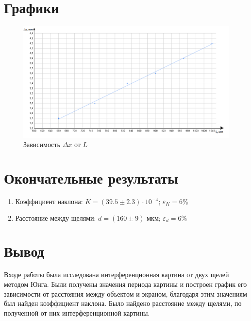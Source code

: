 \documentclass{article}
\begin{document}
\section{Графики}
\begin{figure}[h!]
    \begin{center}
    \includegraphics[scale=0.7]{chart.png}
    \caption{Зависимость $\Delta x$ от $L$}
    \label{fig:graphUfromI}    
    \end{center}
\end{figure}
\newpage
\section{Окончательные результаты}
\begin{enumerate}
    \item Коэффициент наклона: $K = (39.5 \pm 2.3 )\cdot 10^{-4}$; $\varepsilon_{K} = 6\%$  
    \item Расстояние между щелями: $d = (160 \pm 9 )$ мкм; $\varepsilon_{d} = 6\%$  
\end{enumerate}
\newpage
\section{Вывод}
Входе работы была исследована интерференционная картина от двух щелей методом Юнга. Были получены значения периода картины и построен график его зависимости от расстояния между объектом и экраном, благодаря этим значениям был найден коэффициент наклона. Было найдено расстояние между щелями, по полученной от них интерференционной картины.
\end{document}
